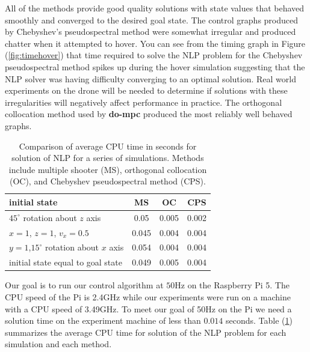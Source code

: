 \documentclass[]{article}
\newcommand{\dompc}{{\bf do-mpc}}
\begin{document}
All of the methods provide good quality solutions with state values that behaved smoothly and converged to the desired goal state.  The control graphs produced by Chebyshev's pseudospectral method were somewhat irregular and produced chatter when it attempted to hover. You can see from the timing graph in Figure (\ref{fig:timehover}) that time required to solve the NLP problem for the Chebyshev pseudospectral method spikes up during the hover simulation suggesting that the NLP solver was having difficulty converging to an optimal solution. Real world experiments on the drone will be needed to determine if solutions with these irregularities will negatively affect performance in practice. The orthogonal collocation method used by {\dompc} produced the most reliably well behaved graphs.  




\begin{table}[h!]	
	\begin{center}
		\begin{tabular}{ | l | c | c | c | } 
			\hline
			initial state & MS & OC & CPS \\
			\hline
			$45^{\circ}$ rotation about $z$ axis &      0.05 & 0.005 &   0.002 \\ 
			$x = 1$, $z=1$, $v_x = 0.5$  &        0.045 &0.004          &  0.004 \\ 
			$y = 1$,$15^{\circ}$ rotation about $x$ axis &      0.054 & 0.004          & 0.004\\ 
				initial state equal to goal state &            0.049  & 0.005    & 0.004 \\ 
			\hline
		\end{tabular}
		\caption{Comparison of average CPU time in seconds for solution of NLP for a series of  simulations. Methods include  multiple shooter (MS), orthogonal collocation (OC), and Chebyshev pseudospectral method (CPS). }
		\label{table:CPU}
	\end{center}

\end{table}

 Our goal is to run our control algorithm at $50$Hz on the Raspberry Pi 5. The CPU speed of the Pi is 2.4GHz while our experiments were run on a machine with a CPU speed of 3.49GHz. To meet our goal of 50Hz on the Pi we need a solution time on the experiment machine of less than $0.014$ seconds. Table (\ref{table:CPU}) summarizes the average CPU time for solution of the NLP problem for each simulation and each method.  
 
\end{document}
